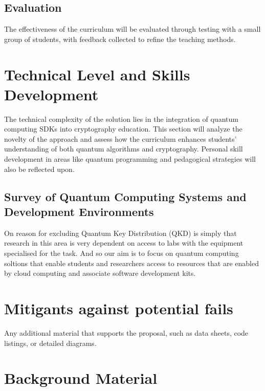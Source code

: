 \documentclass[11pt,a4paper]{article}
\begin{document}
\subsection{Evaluation}
 
The effectiveness of the curriculum will be evaluated through testing with a small group of students, with feedback collected to refine the teaching methods.

\section{Technical Level and Skills Development}

The technical complexity of the solution lies in the integration of quantum computing SDKs into cryptography education.
This section will analyze the novelty of the approach and assess how the curriculum enhances students’ understanding of both quantum algorithms and cryptography.
Personal skill development in areas like quantum programming and pedagogical strategies will also be reflected upon.

\subsection{Survey of Quantum Computing Systems and Development Environments}

On reason for excluding Quantum Key Distribution (QKD) is simply that research in this area is very dependent on access to
labs with the equipment specialised for the task.
And so our aim is to focus on quantum computing soltions that enable students and researchers access to resources that are
enabled by cloud computing and associate software development kits.


\section{Mitigants against potential fails}


\pagebreak

\printbibliography

\pagebreak

\appendix

Any additional material that supports the proposal, such as data sheets, code listings, or detailed diagrams.

\section{Background Material}

\subsection{}



\pagebreak

\printindex
\end{document}
